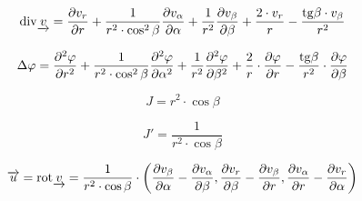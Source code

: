 \begin{equation}
\label{eq:sfericky_ss_div}
\mathrm{div}{\underrightarrow{v}} = \frac{\partial v_r}{\partial r} + \frac{1}{r^2 \cdot \cos^2 \beta} \frac{\partial v_{\alpha}}{\partial \alpha} + \frac{1}{r^2} \frac{\partial v_{\beta}}{\partial \beta} + \frac{2 \cdot v_r}{r} - \frac{\mathrm{tg} \beta \cdot v_{\beta}}{r^2}
\end{equation}

\begin{equation}
\label{eq:sfericky_ss_div}
\Delta \varphi = \frac{\partial^2 \varphi}{\partial r^2} + \frac{1}{r^2 \cdot \cos^2 \beta} \frac{\partial^2 \varphi}{\partial \alpha^2} + \frac{1}{r^2} \frac{\partial^2 \varphi}{\partial \beta^2} + \frac{2}{r} \cdot \frac{\partial \varphi}{\partial r} - \frac{\mathrm{tg} \beta}{r^2} \cdot \frac{\partial \varphi}{\partial \beta}
\end{equation}

\begin{equation}
\label{eq:sfericky_ss_j}
J = r^2 \cdot \cos \beta
\end{equation}

\begin{equation}
\label{eq:sfericky_ss_j_inv}
J' = \frac{1}{r^2 \cdot \cos \beta}
\end{equation}

\begin{equation}
\label{eq:sfericky_ss_rotace}
\overrightarrow{u} = \mathrm{rot} \underrightarrow{v} = \frac{1}{r^2 \cdot \cos \beta} \cdot \left( \frac{\partial v_{\beta}}{\partial \alpha} - \frac{\partial v_{\alpha}}{\partial \beta}, \frac{\partial v_{r}}{\partial \beta} - \frac{\partial v_{\beta}}{\partial r}, \frac{\partial v_{\alpha}}{\partial r} - \frac{\partial v_{r}}{\partial \alpha} \right)
\end{equation}
